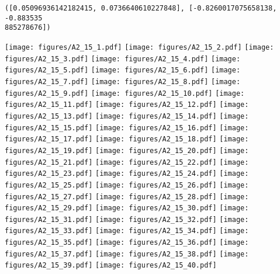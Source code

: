 \documentclass[12pt,a4paper]{article}
\begin{document}
\begin{lstlisting}
([0.05096936142182415, 0.0736640610227848], [-0.8260017075658138, -0.883535
885278676])
\end{lstlisting}

\texttt{[image: figures/A2\_15\_1.pdf]}
\texttt{[image: figures/A2\_15\_2.pdf]}
\texttt{[image: figures/A2\_15\_3.pdf]}
\texttt{[image: figures/A2\_15\_4.pdf]}
\texttt{[image: figures/A2\_15\_5.pdf]}
\texttt{[image: figures/A2\_15\_6.pdf]}
\texttt{[image: figures/A2\_15\_7.pdf]}
\texttt{[image: figures/A2\_15\_8.pdf]}
\texttt{[image: figures/A2\_15\_9.pdf]}
\texttt{[image: figures/A2\_15\_10.pdf]}
\texttt{[image: figures/A2\_15\_11.pdf]}
\texttt{[image: figures/A2\_15\_12.pdf]}
\texttt{[image: figures/A2\_15\_13.pdf]}
\texttt{[image: figures/A2\_15\_14.pdf]}
\texttt{[image: figures/A2\_15\_15.pdf]}
\texttt{[image: figures/A2\_15\_16.pdf]}
\texttt{[image: figures/A2\_15\_17.pdf]}
\texttt{[image: figures/A2\_15\_18.pdf]}
\texttt{[image: figures/A2\_15\_19.pdf]}
\texttt{[image: figures/A2\_15\_20.pdf]}
\texttt{[image: figures/A2\_15\_21.pdf]}
\texttt{[image: figures/A2\_15\_22.pdf]}
\texttt{[image: figures/A2\_15\_23.pdf]}
\texttt{[image: figures/A2\_15\_24.pdf]}
\texttt{[image: figures/A2\_15\_25.pdf]}
\texttt{[image: figures/A2\_15\_26.pdf]}
\texttt{[image: figures/A2\_15\_27.pdf]}
\texttt{[image: figures/A2\_15\_28.pdf]}
\texttt{[image: figures/A2\_15\_29.pdf]}
\texttt{[image: figures/A2\_15\_30.pdf]}
\texttt{[image: figures/A2\_15\_31.pdf]}
\texttt{[image: figures/A2\_15\_32.pdf]}
\texttt{[image: figures/A2\_15\_33.pdf]}
\texttt{[image: figures/A2\_15\_34.pdf]}
\texttt{[image: figures/A2\_15\_35.pdf]}
\texttt{[image: figures/A2\_15\_36.pdf]}
\texttt{[image: figures/A2\_15\_37.pdf]}
\texttt{[image: figures/A2\_15\_38.pdf]}
\texttt{[image: figures/A2\_15\_39.pdf]}
\texttt{[image: figures/A2\_15\_40.pdf]}
\end{document}
